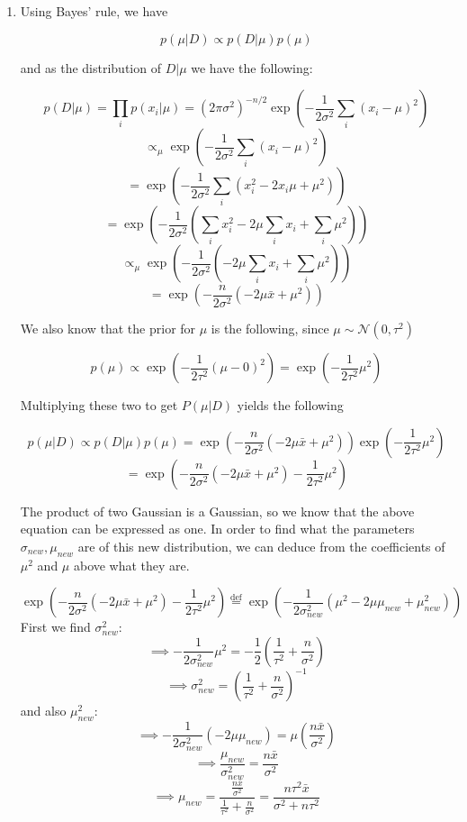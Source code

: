 \documentclass[submit]{harvardml}
\begin{document}
\begin{enumerate}

\item 
Using Bayes' rule, we have

$$p(\mu|D) \propto p(D|\mu)p(\mu)$$

and as the distribution of $D|\mu$ we have the following:

$$p(D|\mu) = \prod_i p(x_i|\mu) = (2\pi\sigma^2)^{-n/2}\exp\left(-\frac{1}{2\sigma^2} \sum_i (x_i-\mu)^2\right)$$
$$\propto_\mu \exp\left(-\frac{1}{2\sigma^2} \sum_i (x_i-\mu)^2\right) $$
$$ = \exp\left(-\frac{1}{2\sigma^2} \sum_i (x_i^2 - 2x_i\mu + \mu^2)\right) $$
$$ = \exp\left(-\frac{1}{2\sigma^2} \left(\sum_i x_i^2 - 2\mu \sum_i x_i + \sum_i \mu^2\right)\right) $$
$$ \propto_\mu \exp\left(-\frac{1}{2\sigma^2} \left( - 2\mu \sum_i x_i + \sum_i \mu^2\right)\right) $$
$$ = \exp\left(-\frac{n}{2\sigma^2} \left( - 2\mu \bar{x} + \mu^2\right)\right) $$

We also know that the prior for $\mu$ is the following, since $\mu\sim \mathcal{N}(0, \tau^2)$

$$p(\mu) \propto \exp\left(-\frac{1}{2\tau^2}  (\mu-0)^2\right) = \exp\left(-\frac{1}{2\tau^2}  \mu^2\right) $$

Multiplying these two to get $P(\mu|D)$ yields the following

$$p(\mu|D) \propto p(D|\mu)p(\mu) = \exp\left(-\frac{n}{2\sigma^2} \left( - 2\mu \bar{x} + \mu^2\right)\right)  \exp\left(-\frac{1}{2\tau^2}  \mu^2\right)$$
$$ = \exp\left(-\frac{n}{2\sigma^2} \left( - 2\mu \bar{x} + \mu^2\right) - \frac{1}{2\tau^2}  \mu^2\right)$$

The product of two Gaussian is a Gaussian, so we know that the above equation can be 
expressed as one. In order to find what the parameters $\sigma_{new}, \mu_{new}$ are of 
this new distribution, we can deduce from the coefficients of $\mu^2$ and $\mu$ above 
what they are.

$$\exp\left(-\frac{n}{2\sigma^2} \left( - 2\mu \bar{x} + \mu^2\right) - \frac{1}{2\tau^2}  \mu^2\right) \stackrel{\text{def}}{=} \exp\left(-\frac{1}{2\sigma_{new}^2}(\mu^2 - 2\mu\mu_{new} + \mu_{new}^2) \right)$$
First we find $\sigma_{new}^2$:
$$ \implies -\frac{1}{2\sigma_{new}^2} \mu^2  = -\frac{1}{2}\left(\frac{1}{\tau^2}+\frac{n}{\sigma^2}\right) $$
$$ \implies \sigma_{new}^2 = \left(\frac{1}{\tau^2}+\frac{n}{\sigma^2}\right)^{-1} $$
and also $\mu_{new}^2$:
$$ \implies  -\frac{1}{2\sigma_{new}^2} (-2\mu\mu_{new}) = \mu\left(\frac{n\bar{x}}{\sigma^2}\right)$$
$$ \implies  \frac{\mu_{new}}{\sigma_{new}^2} = \frac{n\bar{x}}{\sigma^2}$$
$$ \implies  \mu_{new}= \frac{\frac{n\bar{x}}{\sigma^2}}{\frac{1}{\tau^2}+\frac{n}{\sigma^2}}=\frac{n\tau^2\bar{x}}{\sigma^2+n\tau^2}$$



\end{enumerate}
\end{document}

